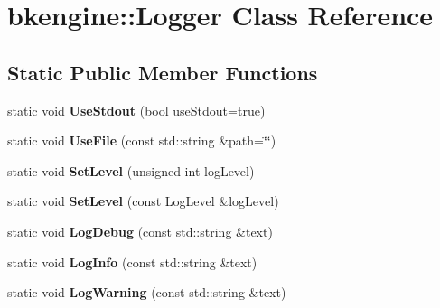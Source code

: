 \hypertarget{classbkengine_1_1Logger}{}\section{bkengine\+:\+:Logger Class Reference}
\label{classbkengine_1_1Logger}
\subsection*{Static Public Member Functions}
\begin{DoxyCompactItemize}
\item 
\mbox{\label{classbkengine_1_1Logger_a285832280f90f1fdd5251ed88b7deec6}} 
static void {\bfseries Use\+Stdout} (bool use\+Stdout=true)
\item 
\mbox{\label{classbkengine_1_1Logger_a8b443fbe097014bf5357960cc9ae3377}} 
static void {\bfseries Use\+File} (const std\+::string \&path=\char`\"{}\char`\"{})
\item 
\mbox{\label{classbkengine_1_1Logger_a7da4e96c7d137c284f21a74e76d7bf35}} 
static void {\bfseries Set\+Level} (unsigned int log\+Level)
\item 
\mbox{\label{classbkengine_1_1Logger_a82eff0daa023837fb4f8adb546f283bb}} 
static void {\bfseries Set\+Level} (const Log\+Level \&log\+Level)
\item 
\mbox{\label{classbkengine_1_1Logger_ad1ef8bf9b65a6fe391201e4628372e58}} 
static void {\bfseries Log\+Debug} (const std\+::string \&text)
\item 
\mbox{\label{classbkengine_1_1Logger_a11760fa555425e9984ba0647c2d8cd07}} 
static void {\bfseries Log\+Info} (const std\+::string \&text)
\item 
\mbox{\label{classbkengine_1_1Logger_a7a5a535c461afc0db634571925088aba}} 
static void {\bfseries Log\+Warning} (const std\+::string \&text)
\item 
\mbox{\label{classbkengine_1_1Logger_acf714f22b291acccfe52da66a443e0a3}} 

\end{DoxyCompactItemize}
